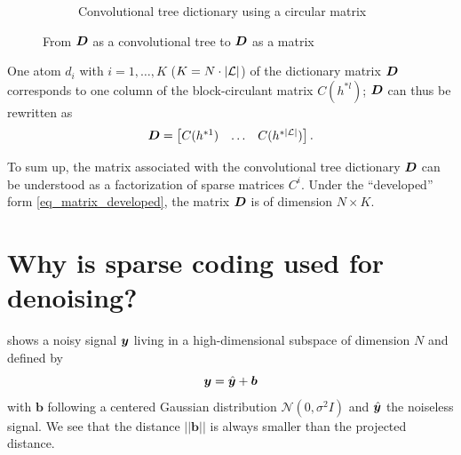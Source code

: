 \begin{figure}[!ht]
\begin{subfigure}[b]{0.69\textwidth}
\caption{Convolutional tree dictionary using a circular matrix}
\end{subfigure}
\caption{From $\bm{D}$ as a convolutional tree to $\bm{D}$ as a matrix}\label{fig_tree_as_matrix}
\end{figure}

\noindent
One atom $d_i$ with $i = 1,\dots,K$ ($K=N \cdot |\mathcal L|$) of the dictionary matrix $\bm{D}$ corresponds to one column of the block-circulant matrix $C(h^{*l})$; $\bm{D}$ can thus be rewritten as
\begin{align}\bm{D} = \begin{bmatrix} C(h^{*1}) & \dots & C(h^{*{|\mathcal L|}}) \end{bmatrix}.\label{eq_matrix_factorized} \end{align}

\noindent
To sum up, the matrix associated with the convolutional tree dictionary $\bm{D}$ can be understood as a factorization of sparse matrices $C^i$. Under the “developed” form \eqref{eq_matrix_developed}, the matrix $\bm{D}$ is of dimension $N \times K$.




\FloatBarrier
\section{Why is sparse coding used for denoising?}

 shows a noisy signal $\bm{y}$ living in a high-dimensional subspace of dimension $N$ and defined by
\begin{equation*}\bm{y}=\hat{\bm{y}} + \bm{b}\end{equation*}
with $\bm{b}$ following a centered Gaussian distribution $\mathcal{N}(0,\sigma^2I)$ and $\hat{\bm{y}}$ the noiseless signal. We see that the distance $||\bm{b}||$ is always smaller than the projected distance.

